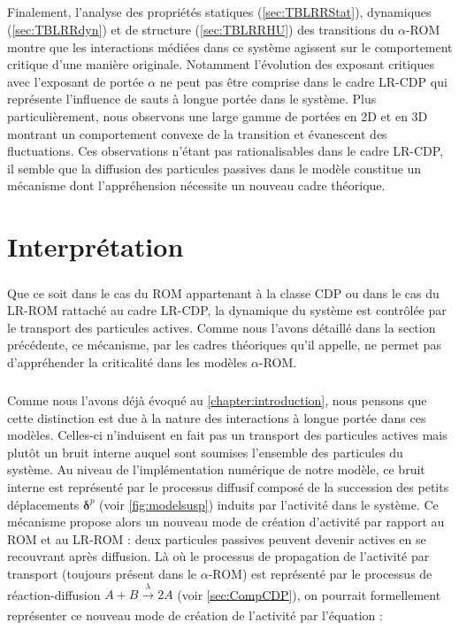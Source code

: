 \subparagraph{}Finalement, l'analyse des propriétés statiques (\autoref{sec:TBLRRStat}), dynamiques (\autoref{sec:TBLRRdyn}) et de structure (\autoref{sec:TBLRRHU}) des transitions du $\alpha$-ROM montre que les interactions médiées dans ce système agissent sur le comportement critique d'une manière originale. Notamment l'évolution des exposant critiques avec l'exposant de portée $\alpha$ ne peut pas être comprise dans le cadre LR-CDP qui représente l'influence de sauts à longue portée dans le système. Plus particulièrement, nous observons une large gamme de portées en 2D et en 3D montrant un comportement convexe de la transition et évanescent des fluctuations. Ces observations n'étant pas rationalisables dans le cadre LR-CDP, il semble que la diffusion des particules passives dans le modèle constitue un mécanisme dont l'appréhension nécessite un nouveau cadre théorique.

\section{Interprétation}

\label{sec:interpret}

\subparagraph{}Que ce soit dans le cas du ROM appartenant à la classe CDP ou dans le cas du LR-ROM rattaché au cadre LR-CDP, la dynamique du système est contrôlée par le transport des particules actives. Comme nous l'avons détaillé dans la section précédente, ce mécanisme, par les cadres théoriques qu'il appelle, ne permet pas d'appréhender la criticalité dans les modèles $\alpha$-ROM.

\subparagraph{}Comme nous l'avons déjà évoqué au \autoref{chapter:introduction}, nous pensons que cette distinction est due à la nature des interactions à longue portée dans ces modèles. Celles-ci n'induisent en fait pas un transport des particules actives mais plutôt un bruit interne auquel sont soumises l'ensemble des particules du système. Au niveau de l'implémentation numérique de notre modèle, ce bruit interne est représenté par le processus diffusif composé de la succession des petits déplacements $\boldsymbol\delta^p$ (voir \autoref{fig:modelsusp}) induits par l'activité dans le système. Ce mécanisme propose alors un nouveau mode de création d'activité par rapport au ROM et au LR-ROM : deux particules passives peuvent devenir actives en se recouvrant après diffusion. Là où le processus de propagation de l'activité par transport (toujours présent dans le $\alpha$-ROM) est représenté par le processus de réaction-diffusion $A +B \xrightarrow[]{\lambda} 2A$ (voir \autoref{sec:CompCDP}), on pourrait formellement représenter ce nouveau mode de création de l'activité par l'équation :

